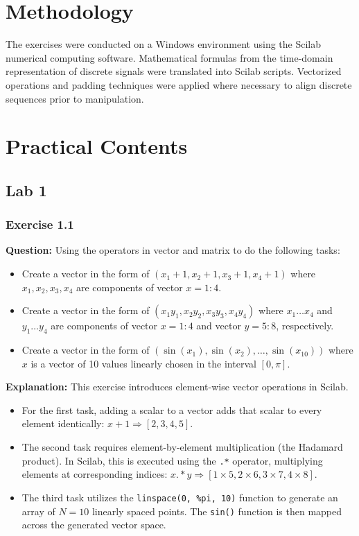 \documentclass[12pt,a4paper]{article}
\begin{document}
\section{Methodology}
The exercises were conducted on a Windows environment using the Scilab numerical computing software. Mathematical formulas from the time-domain representation of discrete signals were translated into Scilab scripts. Vectorized operations and padding techniques were applied where necessary to align discrete sequences prior to manipulation.

\section{Practical Contents}

\subsection{Lab 1}

\subsubsection*{Exercise 1.1}
\textbf{Question:} Using the operators in vector and matrix to do the following tasks:
\begin{itemize}
    \item Create a vector in the form of $(x_1+1, x_2+1, x_3+1, x_4+1)$ where $x_1, x_2, x_3, x_4$ are components of vector $x=1:4$.
    \item Create a vector in the form of $(x_1y_1, x_2y_2, x_3y_3, x_4y_4)$ where $x_1\dots x_4$ and $y_1\dots y_4$ are components of vector $x=1:4$ and vector $y=5:8$, respectively.
    \item Create a vector in the form of $(\sin(x_1), \sin(x_2), \dots, \sin(x_{10}))$ where $x$ is a vector of 10 values linearly chosen in the interval $[0, \pi]$.
\end{itemize}

\textbf{Explanation:} 
This exercise introduces element-wise vector operations in Scilab. 
\begin{itemize}
    \item For the first task, adding a scalar to a vector adds that scalar to every element identically: $x + 1 \Rightarrow [2, 3, 4, 5]$.
    \item The second task requires element-by-element multiplication (the Hadamard product). In Scilab, this is executed using the \texttt{.*} operator, multiplying elements at corresponding indices: $x .* y \Rightarrow [1\times 5, 2\times 6, 3\times 7, 4\times 8]$.
    \item The third task utilizes the \texttt{linspace(0, \%pi, 10)} function to generate an array of $N=10$ linearly spaced points. The \texttt{sin()} function is then mapped across the generated vector space.
\end{itemize}
\end{document}
